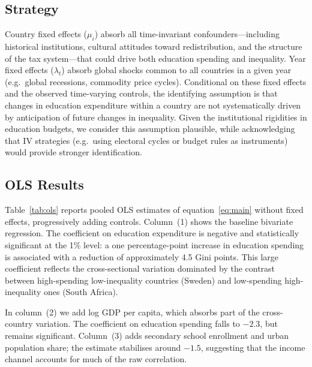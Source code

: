 \documentclass[12pt,a4paper]{article}
\begin{document}
\subsection{Strategy}

Country fixed effects ($\mu_i$) absorb all time-invariant confounders---including
historical institutions, cultural attitudes toward redistribution, and the structure of
the tax system---that could drive both education spending and inequality. Year fixed
effects ($\lambda_t$) absorb global shocks common to all countries in a given year
(e.g.\ global recessions, commodity price cycles). Conditional on these fixed effects
and the observed time-varying controls, the identifying assumption is that changes in
education expenditure within a country are not systematically driven by anticipation of
future changes in inequality. Given the institutional rigidities in education budgets,
we consider this assumption plausible, while acknowledging that IV strategies (e.g.\
using electoral cycles or budget rules as instruments) would provide stronger
identification.

\subsection{OLS Results}

Table~\ref{tab:ols} reports pooled OLS estimates of equation~\eqref{eq:main} without
fixed effects, progressively adding controls. Column~(1) shows the baseline bivariate
regression. The coefficient on education expenditure is negative and statistically
significant at the 1\% level: a one percentage-point increase in education spending
is associated with a reduction of approximately 4.5 Gini points. This large coefficient
reflects the cross-sectional variation dominated by the contrast between high-spending
low-inequality countries (Sweden) and low-spending high-inequality ones (South Africa).

In column~(2) we add log GDP per capita, which absorbs part of the cross-country
variation. The coefficient on education spending falls to $-2.3$, but remains significant.
Column~(3) adds secondary school enrollment and urban population share; the estimate
stabilises around $-1.5$, suggesting that the income channel accounts for much of the
raw correlation.

\begin{table}[H]
  \centering
  \caption{OLS estimates: education expenditure and income inequality}
  \label{tab:ols}
  
\end{table}
\end{document}
